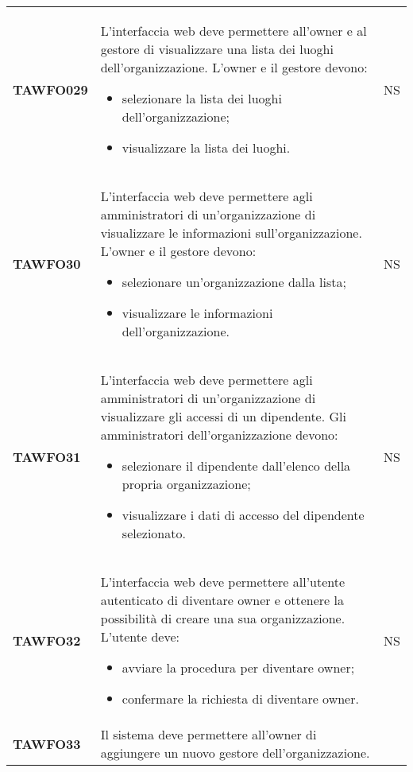 \documentclass[../piano-di-qualifica.tex]{subfiles}
\begin{document}
\begin{centering}
\begin{longtable}[H]{>{\centering\bfseries}m{3cm} >{}p{10cm} >{\centering\arraybackslash}m{3cm}}
        TAWFO029      & L'interfaccia web deve permettere all'owner e al gestore di visualizzare una lista dei luoghi dell'organizzazione. \newline
        L'owner e il gestore devono:
        \begin{itemize}
         \item selezionare la lista dei luoghi dell'organizzazione;
         \item visualizzare la lista dei luoghi.
        \end{itemize}
        & NS \\
        TAWFO30      & L'interfaccia web deve permettere agli amministratori di un'organizzazione di visualizzare le informazioni sull'organizzazione. \newline
        L'owner e il gestore devono:
        \begin{itemize}
         \item selezionare un'organizzazione dalla lista;
         \item visualizzare le informazioni dell'organizzazione.
        \end{itemize}
        & NS \\
        TAWFO31      & L'interfaccia web deve permettere agli amministratori di un'organizzazione di visualizzare gli accessi di un dipendente. \newline
        Gli amministratori dell'organizzazione devono:
        \begin{itemize}
         \item selezionare il dipendente dall'elenco della propria organizzazione;
         \item visualizzare i dati di accesso del dipendente selezionato.
        \end{itemize}
        & NS \\
        TAWFO32      & L'interfaccia web deve permettere all'utente autenticato di diventare owner e ottenere la possibilità di creare una sua organizzazione. \newline
        L'utente deve:
        \begin{itemize}
         \item avviare la procedura per diventare owner;
         \item confermare la richiesta di diventare owner.
        \end{itemize}
        & NS \\
        TAWFO33      & Il sistema deve permettere all'owner di aggiungere un nuovo gestore dell'organizzazione.    \newline

\end{longtable}
\end{centering}
\end{document}
